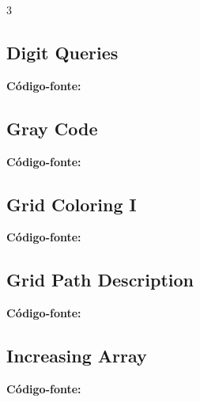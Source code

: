 \documentclass[8pt]{extarticle}
\begin{document}
\begin{multicols*}{3}
\subsection{Digit Queries}
\begin{caixaenunciado}

\end{caixaenunciado}
\vspace{0.3cm}
\noindent\textbf{Código-fonte:}


\subsection{Gray Code}
\begin{caixaenunciado}

\end{caixaenunciado}
\vspace{0.3cm}
\noindent\textbf{Código-fonte:}


\subsection{Grid Coloring I}
\begin{caixaenunciado}

\end{caixaenunciado}
\vspace{0.3cm}
\noindent\textbf{Código-fonte:}


\subsection{Grid Path Description}
\begin{caixaenunciado}

\end{caixaenunciado}
\vspace{0.3cm}
\noindent\textbf{Código-fonte:}


\subsection{Increasing Array}
\begin{caixaenunciado}

\end{caixaenunciado}
\vspace{0.3cm}
\noindent\textbf{Código-fonte:}



\end{multicols*}
\end{document}
